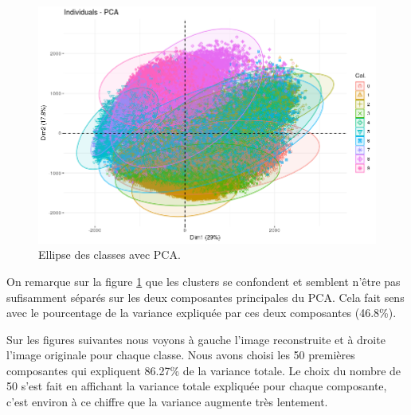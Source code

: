\documentclass{article}
\begin{document}
\begin{figure}[H] 
\centering
\includegraphics[width=\textwidth]{pca_ellipses.png}
\caption{Ellipse des classes avec PCA.}
\label{fig:pca_ellipse}
\end{figure}

On remarque sur la figure \ref{fig:pca_ellipse} que les clusters se confondent et semblent n'être pas sufisamment séparés sur les deux composantes principales du PCA. Cela fait sens avec le pourcentage de la variance expliquée par ces deux composantes (46.8\%).

Sur les figures suivantes nous voyons à gauche l'image reconstruite et à droite l'image originale pour chaque classe. Nous avons choisi les 50 premières composantes qui expliquent 86.27\% de la variance totale. Le choix du nombre de 50 s'est fait en affichant la variance totale expliquée pour chaque composante, c'est environ à ce chiffre que la variance augmente très lentement.
\end{document}
